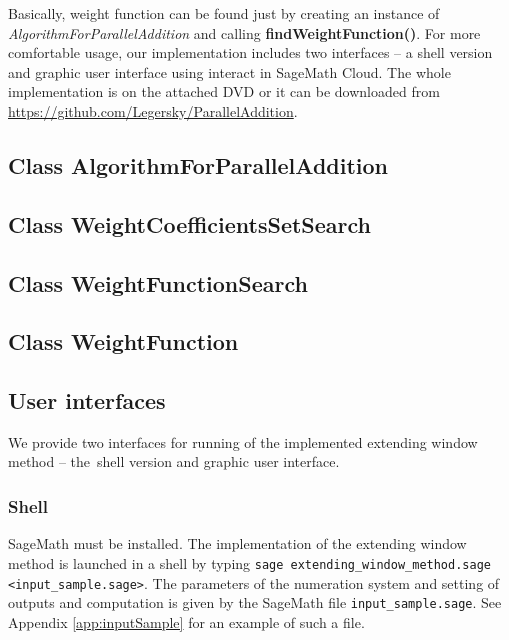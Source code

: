 \begin{upravit}
Basically, weight function can be found just by creating an instance of \emph{AlgorithmForParallelAddition} and calling \textbf{findWeightFunction()}. For more comfortable usage, our implementation includes two interfaces -- a shell version and graphic user interface using interact in SageMath Cloud. The whole implementation is on the attached DVD or it can be downloaded from  \url{https://github.com/Legersky/ParallelAddition}.

\subsection{Class AlgorithmForParallelAddition}



\subsection{Class WeightCoefficientsSetSearch}



\subsection{Class WeightFunctionSearch}



\subsection{Class WeightFunction}


\subsection{User interfaces}
We provide two interfaces for running of the implemented extending window method -- the~shell version and graphic user interface.

\subsubsection{Shell}
SageMath must be installed. The implementation of the extending window method is launched in a shell by typing \verb+sage extending_window_method.sage <input_sample.sage>+. The parameters of the numeration system and setting of outputs and computation is given by the SageMath file \verb+input_sample.sage+. See Appendix \ref{app:inputSample} for an example of such a file.


\end{upravit}
